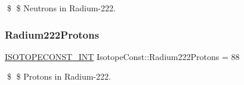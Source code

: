 \$ \$ Neutrons in Radium-\/222. \mbox{\label{group___isotope_const-_radium-_ra222_ga30b0beb69bd7db16e162d1dbd8cf0d03}} 
\subsubsection{\texorpdfstring{Radium222\+Protons}{Radium222Protons}}
{\footnotesize\ttfamily \mbox{\hyperlink{group___isotope_const-_macros_ga5f18360b3e99483a35c32d789e62621c}{I\+S\+O\+T\+O\+P\+E\+C\+O\+N\+S\+T\+\_\+\+I\+NT}} Isotope\+Const\+::\+Radium222\+Protons = 88}

\$ \$ Protons in Radium-\/222. 